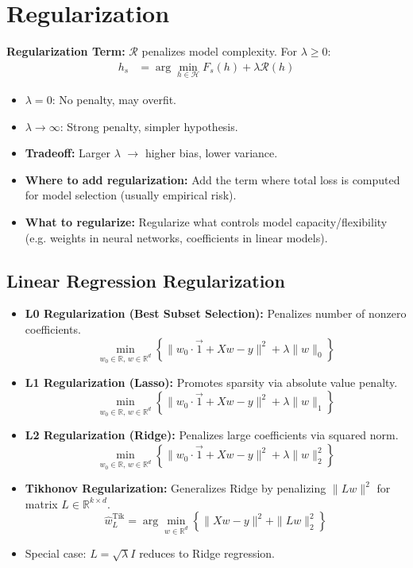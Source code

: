 \section{Regularization}

\textbf{Regularization Term:} $\mathcal{R}$ penalizes model complexity. For $\lambda \geq 0$:
\begin{align*}
    h_s & = \arg\min_{h \in \mathcal{H}} F_s(h) + \lambda \mathcal{R}(h)
\end{align*}
\begin{itemize}
    \item $\lambda = 0$: No penalty, may overfit.
    \item $\lambda \to \infty$: Strong penalty, simpler hypothesis.
    \item \textbf{Tradeoff:} Larger $\lambda$ $\rightarrow$ higher bias, lower variance.
    \item \textbf{Where to add regularization:} Add the term where total loss is computed for model selection (usually empirical risk).
    \item \textbf{What to regularize:} Regularize what controls model capacity/flexibility (e.g. weights in neural networks, coefficients in linear models).
\end{itemize}

\subsection{Linear Regression Regularization}
\begin{itemize}
    \item \textbf{L0 Regularization (Best Subset Selection):} Penalizes number of nonzero coefficients.
          \[
              \min_{w_0 \in \mathbb{R},\, w \in \mathbb{R}^d} \left\{ \|w_0 \cdot \vec{1} + Xw - y\|^2 + \lambda \|w\|_0 \right\}
          \]

    \item \textbf{L1 Regularization (Lasso):} Promotes sparsity via absolute value penalty.
          \[
              \min_{w_0 \in \mathbb{R},\, w \in \mathbb{R}^d} \left\{ \|w_0 \cdot \vec{1} + Xw - y\|^2 + \lambda \|w\|_1 \right\}
          \]

    \item \textbf{L2 Regularization (Ridge):} Penalizes large coefficients via squared norm.
          \[
              \min_{w_0 \in \mathbb{R},\, w \in \mathbb{R}^d} \left\{ \|w_0 \cdot \vec{1} + Xw - y\|^2 + \lambda \|w\|_2^2 \right\}
          \]

    \item \textbf{Tikhonov Regularization:} Generalizes Ridge by penalizing $\|Lw\|^2$ for matrix $L \in \mathbb{R}^{k \times d}$.
          \[
              \hat{w}_L^{\text{Tik}} = \arg\min_{w \in \mathbb{R}^d} \left\{ \|Xw - y\|^2 + \|Lw\|_2^2 \right\}
          \]

    \item[] Special case: $L = \sqrt{\lambda} I$ reduces to Ridge regression.
\end{itemize}


